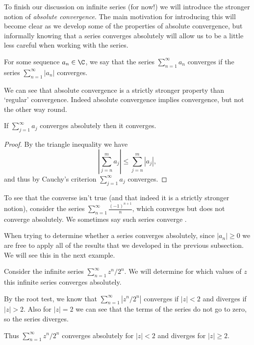 \documentclass[a4paper]{scrartcl}
\begin{document}
To finish our discussion on infinite series (for now!) we will introduce the stronger notion of \emph{absolute convergence}. The main motivation for introducing this will become clear as we develop some of the properties of absolute convergence, but informally knowing that a series converges absolutely will allow us to be a little less careful when working with the series.

\begin{definition}
	For some sequence $a_n \in \C$, we say that the series $\sum_{n = 1}^{\infty} a_n$ converges  if the series $\sum_{n = 1}^{\infty} |a_n|$ converges. 
\end{definition}

We can see that absolute convergence is a strictly stronger property than `regular' convergence. Indeed absolute convergence implies convergence, but not the other way round.

\begin{theorem}
	If $\sum_{j = 1}^{\infty} a_j$ converges absolutely then it converges.
\end{theorem}
\begin{proof}
	By the triangle inequality we have
	$$
	\left|\sum_{j = n}^m a_j\right| \leq \sum_{j = n}^m \left|a_j\right|,
	$$
	and thus by Cauchy's criterion $\sum_{j = 1}^{\infty} a_j$ converges.
\end{proof}

To see that the converse isn't true (and that indeed it is a strictly stronger notion), consider the series $\sum_{n = 1}^{\infty} \frac{(-1)^{n + 1}}{n}$, which converges but does not converge absolutely. We sometimes say such series converge . 

When trying to determine whether a series converges absolutely, since $|a_n| \geq 0$ we are free to apply all of the results that we developed in the previous subsection. We will see this in the next example.

\begin{example}
	Consider the infinite series $\sum_{n = 1}^{\infty} z^n/2^n$. We will determine for which values of $z$ this infinite series converges absolutely.
	
	By the root test, we know that $\sum_{n = 1}^{\infty} |z^n/2^n|$ converges if $|z| < 2$ and diverges if $|z| > 2$. Also for $|z| = 2$ we can see that the terms of the series do not go to zero, so the series diverges.

	Thus $\sum_{n = 1}^{\infty} z^n/2^n$ converges absolutely for $|z| < 2$ and diverges for $|z| \geq 2$.
\end{example}
\end{document}
